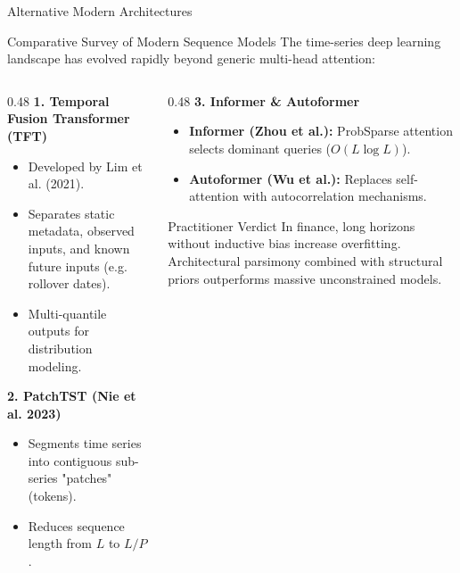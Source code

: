 \documentclass[10pt]{beamer}
\begin{document}
\begin{frame}{Alternative Modern Architectures}
  \begin{block}{Comparative Survey of Modern Sequence Models}
    The time-series deep learning landscape has evolved rapidly beyond generic multi-head attention:
  \end{block}
  \begin{columns}[t]
    \begin{column}{0.48\textwidth}
      \textbf{\scriptsize 1. Temporal Fusion Transformer (TFT)}
      \begin{itemize}\scriptsize
        \item Developed by Lim et al. (2021).
        \item Separates static metadata, observed inputs, and known future inputs (e.g. rollover dates).
        \item Multi-quantile outputs for distribution modeling.
      \end{itemize}
      \textbf{\scriptsize 2. PatchTST (Nie et al. 2023)}
      \begin{itemize}\scriptsize
        \item Segments time series into contiguous sub-series "patches" (tokens).
        \item Reduces sequence length from $L$ to $L/P$.
      \end{itemize}
    \end{column}
    \begin{column}{0.48\textwidth}
      \textbf{\scriptsize 3. Informer \& Autoformer}
      \begin{itemize}\scriptsize
        \item \textbf{Informer (Zhou et al.):} ProbSparse attention selects dominant queries ($O(L \log L)$).
        \item \textbf{Autoformer (Wu et al.):} Replaces self-attention with autocorrelation mechanisms.
      \end{itemize}
      \begin{alertblock}{Practitioner Verdict}
        In finance, long horizons without inductive bias increase overfitting. Architectural parsimony combined with structural priors outperforms massive unconstrained models.
      \end{alertblock}
    \end{column}
  \end{columns}
\end{frame}
\end{document}
